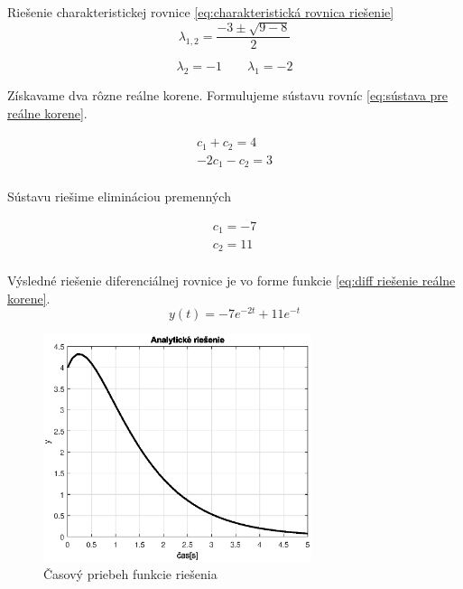 \documentclass[a4paper,10pt]{article}
\begin{document}
Riešenie charakteristickej rovnice \eqref{eq:charakteristická rovnica riešenie}
\begin{equation*}
\lambda_{1,2}=\frac{-3\pm\sqrt{9-8}}{2}
\end{equation*}

\begin{equation*}
	\lambda_2=-1 \qquad \lambda_1=-2
\end{equation*}

Získavame dva rôzne reálne korene.
Formulujeme sústavu rovníc \eqref{eq:sústava pre reálne korene}.

\begin{equation*}
	\begin{array}{c}
	c_1+c_2=4 \\
	-2c_1-c_2=3 \\
	\end{array}
\end{equation*}

Sústavu riešime elimináciou premenných

\begin{equation*}
	\begin{array}{c}
	c_1=-7 \\
	c_2=11 \\
	\end{array}
\end{equation*}

Výsledné riešenie diferenciálnej rovnice je vo forme funkcie \eqref{eq:diff riešenie reálne korene}.
\begin{equation*}
 y(t)=-7e^{-2t}+11e^{-t}
\end{equation*}

\begin{figure}[ht]
\centering
\includegraphics[width=0.7\textwidth]{graf_1} 
\caption{Časový priebeh funkcie riešenia}
\end{figure}
\end{document}
